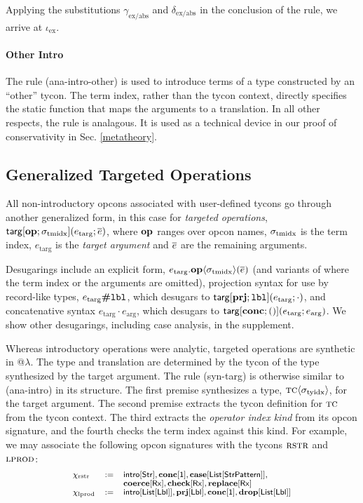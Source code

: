 \documentclass[10pt,preprint]{sigplanconf}
\begin{document}
Applying the substitutions $\gamma_\text{ex/abs}$ and $\delta_\text{ex/abs}$ in the conclusion of the rule, we arrive at $\iota_\text{ex}$.

\paragraph{Other Intro} The rule (ana-intro-other) is used to introduce terms of a type constructed by an ``other'' tycon. The term index, rather than the tycon context, directly specifies the static function that maps the arguments to a translation. In all other respects, the rule is analagous. It is used as a technical device in our proof of conservativity in Sec. \ref{metatheory}.

\subsection{Generalized Targeted Operations} 
All non-introductory opcons associated with user-defined tycons go through another generalized form, in this case for \emph{targeted operations}, ${\sf targ}[\textbf{op}; \sigma_\text{tmidx}](e_\text{targ}; \overline{e})$, where $\textbf{op}$ ranges over opcon names, ${\sigma_\text{tmidx}}$ is the term index, $e_\text{targ}$ is the \emph{target argument} and $\overline{e}$ are the remaining arguments. 

Desugarings include an explicit form, $e_\text{targ}.\textbf{op}\langle\sigma_\text{tmidx}\rangle(\overline{e})$ (and variants of where the term index or the arguments are omitted), projection syntax for use by record-like types, $e_\text{targ}\textbf{\#}\texttt{lbl}$, which desugars to ${\sf targ}[\textbf{prj}; \texttt{lbl}](e_\text{targ}; \cdot)$, and concatenative syntax $e_\text{targ} \cdot e_\text{arg}$, which desugars to ${\sf targ}[\textbf{conc}; ()](e_\text{targ}; e_\text{arg})$. We show other desugarings, including case analysis, in the supplement.


Whereas introductory operations were analytic, targeted operations are synthetic in @$\lambda$. The type and translation are determined by the tycon of the type synthesized by the target argument. The rule (syn-targ) is otherwise similar to (ana-intro) in its structure. The first premise synthesizes a type, ${\textsc{tc}}\langle\sigma_\text{tyidx}\rangle$, for the target argument. The second premise extracts the tycon definition for $\textsc{tc}$ from the tycon context. The third extracts the \emph{operator index kind} from its opcon signature, and the fourth checks the term index against this kind. For example, we may associate the following opcon signatures with the tycons $\textsc{rstr}$ and $\textsc{lprod}$:\[\small
\begin{array}{lcl}
\chi_\text{rstr} & := & \keyw{intro}[\keyw{Str}], \opsig{\opname{conc}}{\kunit}, \opsig{\opname{case}}{\klist{\keyw{StrPattern}}},  \\
& & \opsig{\opname{coerce}}{\krx}, \opsig{\opname{check}}{\krx}, \opsig{\opname{replace}}{\krx}\\
\chi_\text{lprod} & := & \keyw{intro}[\klist{\klbl}], \opsig{\opname{prj}}{\klbl}, \opsig{\opname{conc}}{\kunit}, \opsig{\opname{drop}}{\klist{\klbl}}
\end{array}
\]
\end{document}
